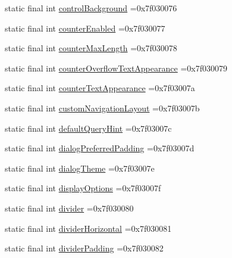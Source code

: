 \begin{DoxyCompactItemize}
static final int \mbox{\hyperlink{classbr_1_1unb_1_1cic_1_1mp_1_1marketmaster_1_1test_1_1R_1_1attr_a65d5cb96b1e3cc70a3102282cedc1775}{control\+Background}} =0x7f030076
\item 
static final int \mbox{\hyperlink{classbr_1_1unb_1_1cic_1_1mp_1_1marketmaster_1_1test_1_1R_1_1attr_a362c393cc0f386433a313d693ba92881}{counter\+Enabled}} =0x7f030077
\item 
static final int \mbox{\hyperlink{classbr_1_1unb_1_1cic_1_1mp_1_1marketmaster_1_1test_1_1R_1_1attr_ad95789833909df6b4f712f173d4c0841}{counter\+Max\+Length}} =0x7f030078
\item 
static final int \mbox{\hyperlink{classbr_1_1unb_1_1cic_1_1mp_1_1marketmaster_1_1test_1_1R_1_1attr_af0048a8020d54160149bbb2b49fffdc1}{counter\+Overflow\+Text\+Appearance}} =0x7f030079
\item 
static final int \mbox{\hyperlink{classbr_1_1unb_1_1cic_1_1mp_1_1marketmaster_1_1test_1_1R_1_1attr_a3251bbe20e46163c9da7f06366c0509d}{counter\+Text\+Appearance}} =0x7f03007a
\item 
static final int \mbox{\hyperlink{classbr_1_1unb_1_1cic_1_1mp_1_1marketmaster_1_1test_1_1R_1_1attr_a069b8b5bacae19d27d16fb087fcedaac}{custom\+Navigation\+Layout}} =0x7f03007b
\item 
static final int \mbox{\hyperlink{classbr_1_1unb_1_1cic_1_1mp_1_1marketmaster_1_1test_1_1R_1_1attr_a1e126c5e6a7b28d37d01f80ea6e8fcdc}{default\+Query\+Hint}} =0x7f03007c
\item 
static final int \mbox{\hyperlink{classbr_1_1unb_1_1cic_1_1mp_1_1marketmaster_1_1test_1_1R_1_1attr_a7b65fa331aa7f1599934b59c8e68ae38}{dialog\+Preferred\+Padding}} =0x7f03007d
\item 
static final int \mbox{\hyperlink{classbr_1_1unb_1_1cic_1_1mp_1_1marketmaster_1_1test_1_1R_1_1attr_a81b65d629db2d60e965c040c5d86b4a6}{dialog\+Theme}} =0x7f03007e
\item 
static final int \mbox{\hyperlink{classbr_1_1unb_1_1cic_1_1mp_1_1marketmaster_1_1test_1_1R_1_1attr_a62f1d92052afe15b0990640f72fbe04c}{display\+Options}} =0x7f03007f
\item 
static final int \mbox{\hyperlink{classbr_1_1unb_1_1cic_1_1mp_1_1marketmaster_1_1test_1_1R_1_1attr_ad1e6dd11826c8f44be59ecd98c74a0f7}{divider}} =0x7f030080
\item 
static final int \mbox{\hyperlink{classbr_1_1unb_1_1cic_1_1mp_1_1marketmaster_1_1test_1_1R_1_1attr_aad44efb04a09f7b612854362c549ddec}{divider\+Horizontal}} =0x7f030081
\item 
static final int \mbox{\hyperlink{classbr_1_1unb_1_1cic_1_1mp_1_1marketmaster_1_1test_1_1R_1_1attr_a67df975c5c27f0e74881a1e34b97b7f6}{divider\+Padding}} =0x7f030082

\end{DoxyCompactItemize}
